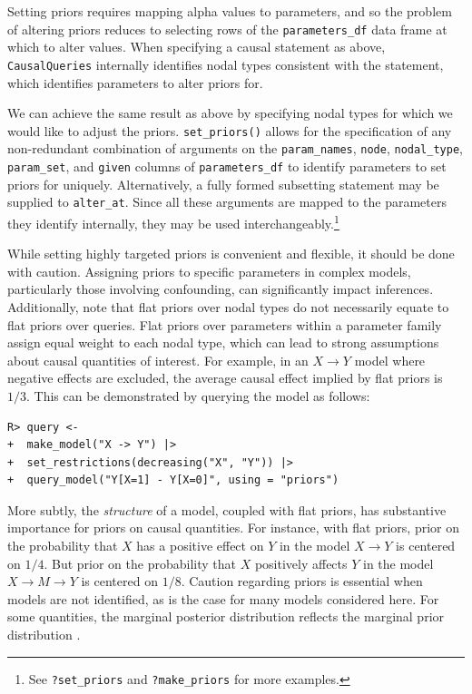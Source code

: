 \documentclass[
  11pt,
  article]{jss}
\begin{document}
Setting priors requires mapping alpha values to parameters, and so the
problem of altering priors reduces to selecting rows of the
\texttt{parameters\_df} data frame at which to alter values. When
specifying a causal statement as above, \texttt{CausalQueries}
internally identifies nodal types consistent with the statement, which
identifies parameters to alter priors for.

We can achieve the same result as above by specifying nodal types for
which we would like to adjust the priors. \texttt{set\_priors()} allows
for the specification of any non-redundant combination of arguments on
the \texttt{param\_names}, \texttt{node}, \texttt{nodal\_type},
\texttt{param\_set}, and \texttt{given} columns of
\texttt{parameters\_df} to identify parameters to set priors for
uniquely. Alternatively, a fully formed subsetting statement may be
supplied to \texttt{alter\_at}. Since all these arguments are mapped to
the parameters they identify internally, they may be used
interchangeably.\footnote{See \texttt{?set\_priors} and
  \texttt{?make\_priors} for more examples.}

While setting highly targeted priors is convenient and flexible, it
should be done with caution. Assigning priors to specific parameters in
complex models, particularly those involving confounding, can
significantly impact inferences. Additionally, note that flat priors
over nodal types do not necessarily equate to flat priors over queries.
Flat priors over parameters within a parameter family assign equal
weight to each nodal type, which can lead to strong assumptions about
causal quantities of interest. For example, in an \(X \rightarrow Y\)
model where negative effects are excluded, the average causal effect
implied by flat priors is \(1/3\). This can be demonstrated by querying
the model as follows:

\begin{verbatim}
R> query <- 
+  make_model("X -> Y") |>
+  set_restrictions(decreasing("X", "Y")) |>
+  query_model("Y[X=1] - Y[X=0]", using = "priors")
\end{verbatim}

More subtly, the \emph{structure} of a model, coupled with flat priors,
has substantive importance for priors on causal quantities. For
instance, with flat priors, prior on the probability that \(X\) has a
positive effect on \(Y\) in the model \(X \rightarrow Y\) is centered on
\(1/4\). But prior on the probability that \(X\) positively affects
\(Y\) in the model \(X \rightarrow M \rightarrow Y\) is centered on
\(1/8\). Caution regarding priors is essential when models are not
identified, as is the case for many models considered here. For some
quantities, the marginal posterior distribution reflects the marginal
prior distribution \citep{poirier_revising_1998}.
\end{document}
